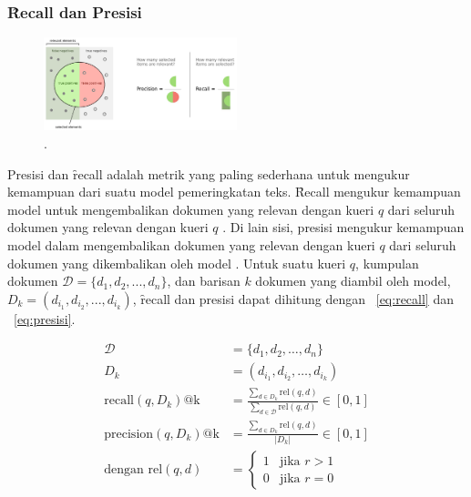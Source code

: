         \subsubsection{\f{Recall} dan Presisi}

        \begin{figure}
            \centering
            \includegraphics[width=0.50\textwidth]{assets/pics/recall-presisi.png}
            \caption{\license.}
            \label{fig:recall-precision}
        \end{figure}
        
        Presisi dan \f{recall} adalah metrik yang paling sederhana untuk mengukur kemampuan dari suatu model pemeringkatan teks. \f{Recall} mengukur kemampuan model untuk mengembalikan dokumen yang relevan dengan kueri $q$ dari seluruh dokumen yang relevan dengan kueri $q$ \citep{textrankingsurvey}. Di lain sisi, presisi mengukur kemampuan model dalam mengembalikan dokumen yang relevan dengan kueri $q$ dari seluruh dokumen yang dikembalikan oleh model \citep{textrankingsurvey}. Untuk suatu kueri $q$, kumpulan dokumen $\mathcal{D} = \{d_1, d_2, ..., d_n\}$, dan barisan $k$ dokumen yang diambil oleh model, $D_k = (d_{i_1}, d_{i_2}, ..., d_{i_k})$, \f{recall} dan presisi dapat dihitung dengan \equ~\ref{eq:recall} dan \equ~\ref{eq:presisi}.

        \begin{align}
            \label{eq:recall}
            \mathcal{D} &= \{d_1, d_2, \dots, d_n\} \\
            D_k &= (d_{i_1}, d_{i_2}, \dots, d_{i_k}) \\
            \text{recall}(q, D_k)\text{@k} &= \frac{\sum_{d \in D_k} \text{rel}(q, d)}{\sum_{d \in \mathcal{D}} \text{rel}(q, d)} \in [0, 1] \\
            \label{eq:presisi}
            \text{precision}(q, D_k)\text{@k} &= \frac{\sum_{d \in D_k} \text{rel}(q, d)}{|D_k|} \in [0, 1] \\
            \label{eq:rel}
            \text{dengan } \text{rel}(q, d) &= \begin{cases} 
            1 & \text{jika } r > 1 \\
            0 & \text{jika } r = 0
            \end{cases}        
        \end{align}

